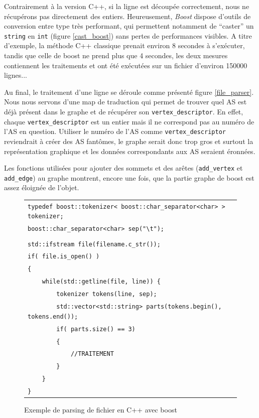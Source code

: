 Contrairement à la version C++, si la ligne est découpée correctement, nous ne récupérons pas directement des entiers. Heureusement, \textit{Boost} dispose d'outils de conversion entre type très performant, qui permettent notamment de ``caster'' un \verb|string| en \verb|int| (figure \ref{cast_boost}) sans pertes de performances visibles. A titre d'exemple, la méthode C++ classique prenait environ 8 secondes à s'exécuter, tandis que celle de boost ne prend plus que 4 secondes, les deux mesures contiennent les traitements et ont été exécutées sur un fichier d'environ 150000 lignes...

Au final, le traitement d'une ligne se déroule comme présenté figure \ref{file_parser}. Nous nous servons d'une map de traduction qui permet de trouver quel AS est déjà présent dans le graphe et de récupérer son \verb|vertex_descriptor|. En effet, chaque \verb|vertex_descriptor| est un entier mais il ne correspond pas au numéro de l'AS en question. Utiliser le numéro de l'AS comme \verb|vertex_descriptor| reviendrait à créer des AS fantômes, le graphe serait donc trop gros et surtout la représentation graphique et les données correspondants aux AS seraient éronnées.

Les fonctions utilisées pour ajouter des sommets et des arêtes (\verb|add_vertex| et \verb|add_edge|) au graphe montrent, encore une fois, que la partie graphe de boost est assez éloignée de l'objet.

\begin{figure}[H]
   \begin{center}
      \begin{tabular}{l}
        \hline 
 	\verb|typedef boost::tokenizer< boost::char_separator<char> > tokenizer;|\\
 	\verb|boost::char_separator<char> sep("\t");|\\
	\verb||\\
	\verb|std::ifstream file(filename.c_str());|\\
	\verb|if( file.is_open() )|\\
	\verb|{|\\
	\verb|    while(std::getline(file, line)) {|\\
	\verb|        tokenizer tokens(line, sep);|\\
	\verb|        std::vector<std::string> parts(tokens.begin(), tokens.end());|\\
	\verb|        if( parts.size() == 3)|\\
	\verb|        {|\\
	\verb|            //TRAITEMENT|\\
	\verb|        }|\\
	\verb|    }|\\
	\verb|}|\\
        \hline
      \end{tabular}
   \end{center}
\caption{\label{parse_boost} Exemple de parsing de fichier en C++ avec boost}
\end{figure}
 


